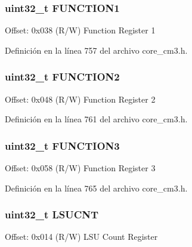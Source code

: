 \subsubsection[{\texorpdfstring{F\+U\+N\+C\+T\+I\+O\+N1}{FUNCTION1}}]{ uint32\+\_\+t F\+U\+N\+C\+T\+I\+O\+N1}\hypertarget{struct_d_w_t___type_afbea004f9e2860b9f450bcea21eec318}{}\label{struct_d_w_t___type_afbea004f9e2860b9f450bcea21eec318}
Offset\+: 0x038 (R/W) Function Register 1 

Definición en la línea 757 del archivo core\+\_\+cm3.\+h.

\subsubsection[{\texorpdfstring{F\+U\+N\+C\+T\+I\+O\+N2}{FUNCTION2}}]{ uint32\+\_\+t F\+U\+N\+C\+T\+I\+O\+N2}\hypertarget{struct_d_w_t___type_a93d1f9f928292854f16333500e554c41}{}\label{struct_d_w_t___type_a93d1f9f928292854f16333500e554c41}
Offset\+: 0x048 (R/W) Function Register 2 

Definición en la línea 761 del archivo core\+\_\+cm3.\+h.

\subsubsection[{\texorpdfstring{F\+U\+N\+C\+T\+I\+O\+N3}{FUNCTION3}}]{ uint32\+\_\+t F\+U\+N\+C\+T\+I\+O\+N3}\hypertarget{struct_d_w_t___type_ad3bf90012b7b60cd030c54ed0ec0442d}{}\label{struct_d_w_t___type_ad3bf90012b7b60cd030c54ed0ec0442d}
Offset\+: 0x058 (R/W) Function Register 3 

Definición en la línea 765 del archivo core\+\_\+cm3.\+h.

\subsubsection[{\texorpdfstring{L\+S\+U\+C\+NT}{LSUCNT}}]{ uint32\+\_\+t L\+S\+U\+C\+NT}\hypertarget{struct_d_w_t___type_ab1d62b8e1a69bead9717d5a02f741811}{}\label{struct_d_w_t___type_ab1d62b8e1a69bead9717d5a02f741811}
Offset\+: 0x014 (R/W) L\+SU Count Register 

